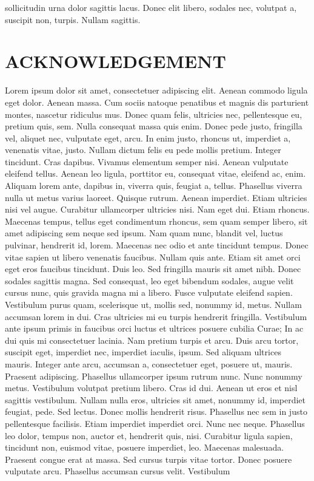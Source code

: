 \documentclass[a4paper, 12pt]{report}
\begin{document}
\begin{singlespace}
sollicitudin urna dolor sagittis lacus. Donec elit libero, sodales nec, volutpat a, suscipit non, turpis. Nullam sagittis.  \\
					
				\end{singlespace}
			
			\chapter*{\fontsize{14}{17} \selectfont \centering ACKNOWLEDGEMENT}
			\begin{singlespace}
				Lorem ipsum dolor sit amet, consectetuer adipiscing elit. Aenean commodo ligula eget dolor. Aenean massa. Cum sociis natoque penatibus et magnis dis parturient montes, nascetur ridiculus mus. Donec quam felis, ultricies nec, pellentesque eu, pretium quis, sem. Nulla consequat massa quis enim. Donec pede justo, fringilla vel, aliquet nec, vulputate eget, arcu. In enim justo, rhoncus ut, imperdiet a, venenatis vitae, justo. Nullam dictum felis eu pede mollis pretium. Integer tincidunt. Cras dapibus. Vivamus elementum semper nisi. Aenean vulputate eleifend tellus. Aenean leo ligula, porttitor eu, consequat vitae, eleifend ac, enim. Aliquam lorem ante, dapibus in, viverra quis, feugiat a, tellus. Phasellus viverra nulla ut metus varius laoreet. Quisque rutrum. Aenean imperdiet. Etiam ultricies nisi vel augue. Curabitur ullamcorper ultricies nisi. Nam eget dui. Etiam rhoncus. Maecenas tempus, tellus eget condimentum rhoncus, sem quam semper libero, sit amet adipiscing sem neque sed ipsum. Nam quam nunc, blandit vel, luctus pulvinar, hendrerit id, lorem. Maecenas nec odio et ante tincidunt tempus. Donec vitae sapien ut libero venenatis faucibus. Nullam quis ante. Etiam sit amet orci eget eros faucibus tincidunt. Duis leo. Sed fringilla mauris sit amet nibh. Donec sodales sagittis magna. Sed consequat, leo eget bibendum sodales, augue velit cursus nunc, quis gravida magna mi a libero. Fusce vulputate eleifend sapien. Vestibulum purus quam, scelerisque ut, mollis sed, nonummy id, metus. Nullam accumsan lorem in dui. Cras ultricies mi eu turpis hendrerit fringilla. Vestibulum ante ipsum primis in faucibus orci luctus et ultrices posuere cubilia Curae; In ac dui quis mi consectetuer lacinia. Nam pretium turpis et arcu. Duis arcu tortor, suscipit eget, imperdiet nec, imperdiet iaculis, ipsum. Sed aliquam ultrices mauris. Integer ante arcu, accumsan a, consectetuer eget, posuere ut, mauris. Praesent adipiscing. Phasellus ullamcorper ipsum rutrum nunc. Nunc nonummy metus. Vestibulum volutpat pretium libero. Cras id dui. Aenean ut eros et nisl sagittis vestibulum. Nullam nulla eros, ultricies sit amet, nonummy id, imperdiet feugiat, pede. Sed lectus. Donec mollis hendrerit risus. Phasellus nec sem in justo pellentesque facilisis. Etiam imperdiet imperdiet orci. Nunc nec neque. Phasellus leo dolor, tempus non, auctor et, hendrerit quis, nisi. Curabitur ligula sapien, tincidunt non, euismod vitae, posuere imperdiet, leo. Maecenas malesuada. Praesent congue erat at massa. Sed cursus turpis vitae tortor. Donec posuere vulputate arcu. Phasellus accumsan cursus velit. Vestibulum 
\end{singlespace}
\end{document}

